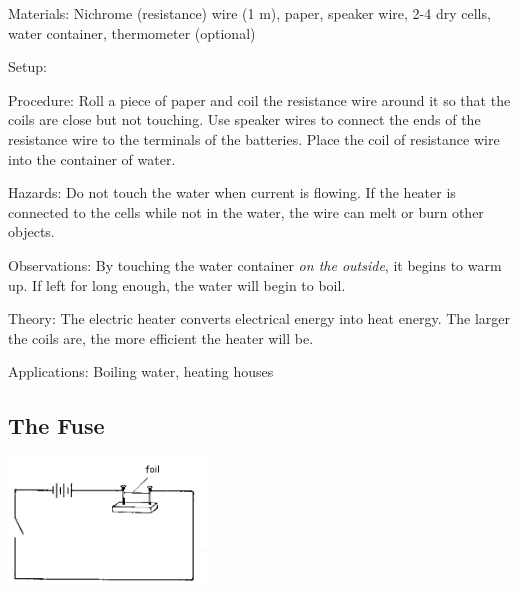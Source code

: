 \begin{multicols}{2}
\begin{description*}
\item[Materials:]{Nichrome (resistance) wire (1 m), paper, speaker wire, 2-4 dry cells, water container, thermometer (optional)}
\item[Setup:]{}
\item[Procedure:]{Roll a piece of paper and coil the resistance wire around it so that the coils are close but not touching. Use speaker wires to connect the ends of the resistance wire to the terminals of the batteries. Place the coil of resistance wire into the container of water.}
\item[Hazards:]{Do not touch the water when current is flowing. If the heater is connected to the cells while not in the water, the wire can melt or burn other objects.}
\item[Observations:]{By touching the water container \emph{on the outside}, it begins to warm up. If left for long enough, the water will begin to boil.}
\item[Theory:]{The electric heater converts electrical energy into heat energy. The larger the coils are, the more efficient the heater will be.}
\item[Applications:]{Boiling water, heating houses}
\end{description*}

\subsection{The Fuse}

\begin{center}
\includegraphics[width=0.4\textwidth]{./img/source/fuse.png}
\end{center}


\end{multicols}
